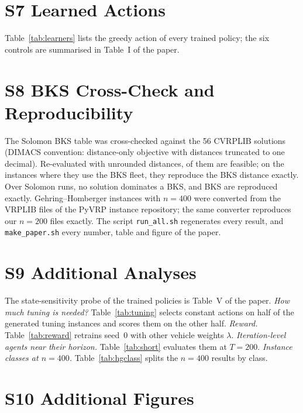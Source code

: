 \documentclass[conference,onecolumn]{IEEEtran}
\begin{document}
\section*{S7 Learned Actions}
Table~\ref{tab:learners} lists the greedy action of every trained policy; the six controls are summarised
in Table~I of the paper.


\section*{S8 BKS Cross-Check and Reproducibility}
The Solomon BKS table was cross-checked against the 56 CVRPLIB solutions (DIMACS convention: distance-only objective
with distances truncated to one decimal). Re-evaluated with unrounded distances, \tCvFeas{} of them are feasible; on
the \tCvSame{} instances where they use the BKS fleet, they reproduce the BKS distance exactly. Over \tNsolRuns{}
Solomon runs, no solution dominates a BKS, and \tBksHit{} BKS are reproduced exactly. Gehring--Homberger instances
with $n=400$ were converted from the VRPLIB files of the PyVRP instance repository; the same converter reproduces our
$n=200$ files exactly. The script \texttt{run\_all.sh} regenerates every result, and \texttt{make\_paper.sh} every
number, table and figure of the paper.

\section*{S9 Additional Analyses}
The state-sensitivity probe of the trained policies is Table~V of the paper.
\emph{How much tuning is needed?} Table~\ref{tab:tuning} selects constant actions on half of the generated tuning
instances and scores them on the other half. \emph{Reward.} Table~\ref{tab:reward} retrains seed~0 with other vehicle
weights $\lambda$. \emph{Iteration-level agents near their horizon.} Table~\ref{tab:short} evaluates them at $T=200$.
\emph{Instance classes at $n=400$.} Table~\ref{tab:hgclass} splits the $n=400$ results by class.





\section*{S10 Additional Figures}
\end{document}

